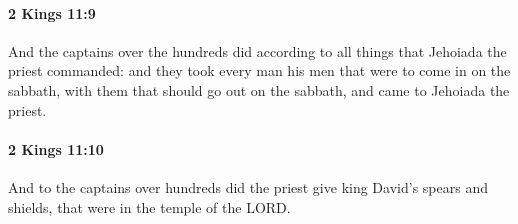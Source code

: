 		\paragraph{2 Kings 11:9} %
			\label{2KINGS-11-9}

			And the captains over the hundreds did according to all things that Jehoiada the priest commanded: and they took every man his men that were to come in on the sabbath, with them that should go out on the sabbath, and came to Jehoiada the priest.


		\paragraph{2 Kings 11:10} %
			\label{2KINGS-11-10}

			And to the captains over hundreds did the priest give king David’s spears and shields, that were in the temple of the LORD.


